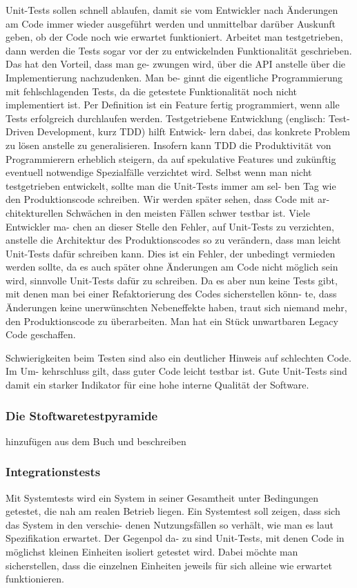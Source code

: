 Unit-Tests sollen schnell ablaufen, damit sie vom Entwickler nach Änderungen am Code
immer wieder ausgeführt werden und unmittelbar darüber Auskunft geben, ob der Code
noch wie erwartet funktioniert. Arbeitet man testgetrieben, dann werden die Tests sogar
vor der zu entwickelnden Funktionalität geschrieben. Das hat den Vorteil, dass man ge-
zwungen wird, über die API anstelle über die Implementierung nachzudenken. Man be-
ginnt die eigentliche Programmierung mit fehlschlagenden Tests, da die getestete Funktionalität 
noch nicht implementiert ist. Per Definition ist ein Feature fertig programmiert,
wenn alle Tests erfolgreich durchlaufen werden.
Testgetriebene Entwicklung (englisch: Test-Driven Development, kurz TDD) hilft Entwick-
lern dabei, das konkrete Problem zu lösen anstelle zu generalisieren. Insofern kann TDD
die Produktivität von Programmierern erheblich steigern, da auf spekulative Features und
zukünftig eventuell notwendige Spezialfälle verzichtet wird.
Selbst wenn man nicht testgetrieben entwickelt, sollte man die Unit-Tests immer am sel-
ben Tag wie den Produktionscode schreiben. Wir werden später sehen, dass Code mit ar-
chitekturellen Schwächen in den meisten Fällen schwer testbar ist. Viele Entwickler ma-
chen an dieser Stelle den Fehler, auf Unit-Tests zu verzichten, anstelle die Architektur des
Produktionscodes so zu verändern, dass man leicht Unit-Tests dafür schreiben kann. Dies
ist ein Fehler, der unbedingt vermieden werden sollte, da es auch später ohne Änderungen
am Code nicht möglich sein wird, sinnvolle Unit-Tests dafür zu schreiben. Da es aber nun
keine Tests gibt, mit denen man bei einer Refaktorierung des Codes sicherstellen könn-
te, dass Änderungen keine unerwünschten Nebeneffekte haben, traut sich niemand mehr,
den Produktionscode zu überarbeiten. Man hat ein Stück unwartbaren Legacy Code geschaffen.

Schwierigkeiten beim Testen sind also ein deutlicher Hinweis auf schlechten Code. Im Um-
kehrschluss gilt, dass guter Code leicht testbar ist. Gute Unit-Tests sind damit ein starker
Indikator für eine hohe interne Qualität der Software.

\subsubsection{Die Stoftwaretestpyramide}

hinzufügen aus dem Buch und beschreiben



\subsubsection{Integrationstests}
Mit Systemtests wird ein System in seiner Gesamtheit unter Bedingungen getestet, die nah
am realen Betrieb liegen. Ein Systemtest soll zeigen, dass sich das System in den verschie-
denen Nutzungsfällen so verhält, wie man es laut Spezifikation erwartet. Der Gegenpol da-
zu sind Unit-Tests, mit denen Code in möglichst kleinen Einheiten isoliert getestet wird.
Dabei möchte man sicherstellen, dass die einzelnen Einheiten jeweils für sich alleine wie
erwartet funktionieren.

